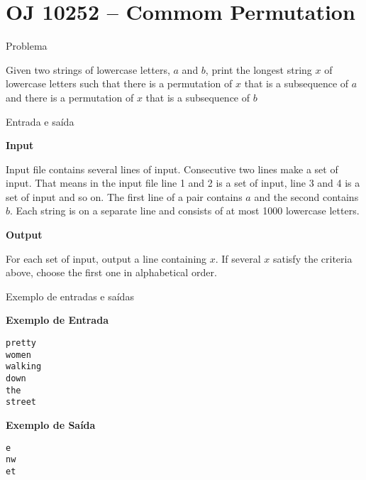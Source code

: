 \section{OJ 10252 -- Commom Permutation}

\begin{frame}[fragile]{Problema}

Given two strings of lowercase letters, $a$ and $b$, print the longest string $x$ of lowercase 
letters such that there is a permutation of $x$ that is a subsequence of $a$ and there is a 
permutation of $x$ that is a subsequence of $b$

\end{frame}

\begin{frame}[fragile]{Entrada e saída}

\textbf{Input}

Input file contains several lines of input. Consecutive two lines make a set of input. That means 
in the input file line 1 and 2 is a set of input, line 3 and 4 is a set of input and so on. The 
first line of a pair contains $a$ and the second contains $b$. Each string is on a separate line 
and consists of at most 1000 lowercase letters.

\vspace{0.1in}

\textbf{Output}

For each set of input, output a line containing $x$. If several $x$ satisfy the criteria above, 
choose the first one in alphabetical order.

\end{frame}

\begin{frame}[fragile]{Exemplo de entradas e saídas}

\begin{minipage}[t]{0.5\textwidth}
\textbf{Exemplo de Entrada}
\begin{verbatim}
pretty
women
walking
down
the
street
\end{verbatim}
\end{minipage}
\begin{minipage}[t]{0.45\textwidth}
\textbf{Exemplo de Saída}
\begin{verbatim}
e
nw
et
\end{verbatim}
\end{minipage}
\end{frame}

